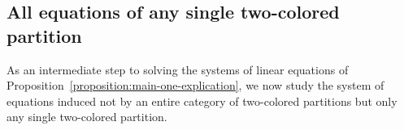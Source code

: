 \documentclass[pdftex]{sigma}
\numberwithin{equation}{section}
\begin{document}
\subsection{All equations of any single two-colored partition}
\label{section:main-one-simplifications-third-simplification}
{
  \newcommand{\inlen}{k}
  \newcommand{\outlen}{\ell}
  \newcommand{\infree}{g}
  \newcommand{\outfree}{j}
  \newcommand{\incol}{\Yc{c}}
  \newcommand{\outcol}{\Yc{d}}
  \newcommand{\thepartition}{p}
  \newcommand{\somerel}{r}
  \newcommand{\sometuple}{x}
    \newcommand{\themat}{v}
  \newcommand{\thematx}[2]{v_{#1,#2}}
  \newcommand{\thetuple}{x^\themat}
  \newcommand{\altoutfree}{j'}
  \newcommand{\altinfree}{g'}
  As an intermediate step to solving the systems of linear equations of Pro\-po\-si\-tion~\ref{proposition:main-one-explication}, we now study the system of equations induced not by an entire category of two-colored partitions but only any single two-colored partition.
}
\end{document}
